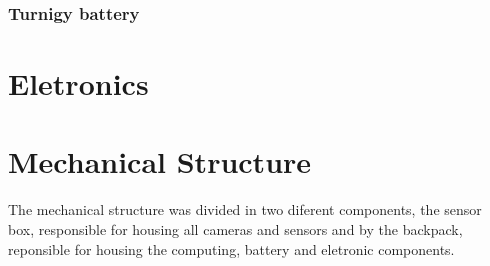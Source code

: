 \subsubsection*{Turnigy battery}


\section{Eletronics}


\section{Mechanical Structure}

The mechanical structure was divided in two diferent components, the sensor box, responsible for housing all cameras and sensors and by the backpack, reponsible for housing the computing, battery and eletronic components.

